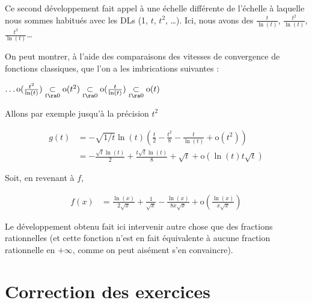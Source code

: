 \documentclass[12pt]{article}
\begin{document}
\begin{Exems}
\begin{itemize}
Ce second développement fait appel à une échelle différente de l'échelle à
laquelle nous sommes habitués avec les DLs (1, $t$, $t^2$, \dots). Ici,
nous avons des $\frac{t}{\ln(t)}$, $\frac{t^2}{\ln(t)}$,
$\frac{t^3}{\ln(t)}$\dots

On peut montrer, à l'aide des comparaisons des vitesses de convergence de
fonctions classiques, que l'on a les imbrications suivantes :

$\dots \text{o}(\frac{t^2}{\ln(t)})\underset{t\ra 0}{\subset} \text{o}(t^2)\underset{t\ra 0}{\subset} \text{o}(\frac{t}{\ln(t)})\underset{t\ra 0}{\subset} \text{o}(t)$

Allons par exemple jusqu'à la précision $t^2$

\begin{align*}
g(t)
&=-\sqrt{1/t}\ln(t)\left(\frac{t}{2}-\frac{t^2}{8}-\frac{t}{\ln(t)}+\text{o}(t^2)\right)\\
&= -\frac{\sqrt{t}\ln(t)}{2}+\frac{t\sqrt{t}\ln(t)}{8}+\sqrt{t}+\text{o}(\ln(t)t\sqrt{t})
\end{align*}


Soit, en revenant à $f$, 

\begin{align*}
f(x)
&= \frac{\ln(x)}{2\sqrt{x}}+\frac{1}{\sqrt{x}}-\frac{\ln(x)}{8x\sqrt{x}}+\text{o}\left(\frac{\ln(x)}{x\sqrt{x}}\right)
\end{align*}


\end{itemize}

Le développement obtenu fait ici intervenir autre chose que des fractions
rationnelles (et cette fonction n'est en fait équivalente à aucune fraction
rationnelle en $+\infty$, comme on peut aisément s'en convaincre).

\end{Exems}


\newpage
\section*{Correction des exercices}




\end{document}
